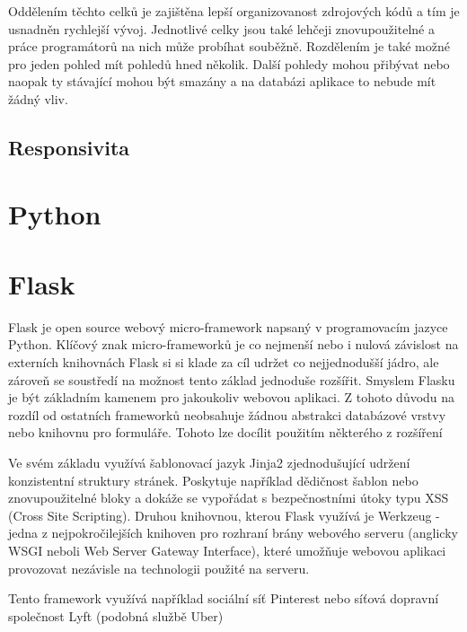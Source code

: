 Oddělením těchto celků je zajištěna lepší organizovanost zdrojových kódů a tím je usnadněn rychlejší vývoj. Jednotlivé celky jsou také lehčeji znovupoužitelné a práce programátorů na nich může probíhat souběžně. Rozdělením je také možné pro jeden pohled mít pohledů hned několik. Další pohledy mohou přibývat nebo naopak ty stávající mohou být smazány a na databázi aplikace to nebude mít žádný vliv.

\subsection{Responsivita}
\blindtext[2]

\section{Python}
\blindtext[2]

\section{Flask}
Flask je open source webový micro-framework napsaný v programovacím jazyce Python. Klíčový znak micro-frameworků je co nejmenší nebo i nulová závislost na externích knihovnách %
Flask si si klade za cíl udržet co nejjednodušší jádro, ale zároveň se soustředí na možnost tento základ jednoduše rozšířit.
Smyslem Flasku je být základním kamenem pro jakoukoliv webovou aplikaci. Z tohoto důvodu na rozdíl od ostatních frameworků neobsahuje žádnou abstrakci databázové vrstvy nebo knihovnu pro formuláře. Tohoto lze docílit použitím některého z rozšíření %

Ve svém základu využívá šablonovací jazyk Jinja2 zjednodušující udržení konzistentní struktury stránek. Poskytuje například dědičnost šablon nebo znovupoužitelné bloky a dokáže se vypořádat s bezpečnostními útoky typu XSS (Cross Site Scripting). %
Druhou knihovnou, kterou Flask využívá je Werkzeug - jedna z nejpokročilejších knihoven pro rozhraní brány webového serveru (anglicky WSGI neboli Web Server Gateway Interface), které umožňuje webovou aplikaci provozovat nezávisle na technologii použité na serveru. %

Tento framework využívá například sociální síť Pinterest %
nebo síťová dopravní společnost Lyft %
(podobná službě Uber)

